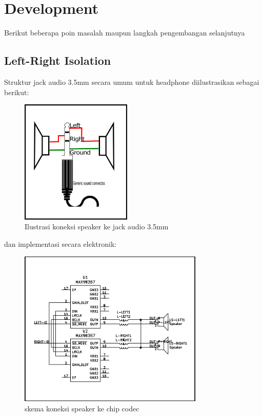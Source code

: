 \documentclass[12pt,]{article}
\begin{document}
	\newpage
	\section{Development}
	
	Berikut beberapa poin masalah maupun langkah pengembangan selanjutnya
	
	\subsection{Left-Right Isolation}
	
	Struktur jack audio 3.5mm secara umum untuk headphone diilustrasikan sebagai berikut:
	
	\begin{figure}[!ht]
		\centering
		\includegraphics[width=150pt]{images/ohmhp}
		\caption{Ilustrasi koneksi speaker ke jack audio 3.5mm}
	\end{figure}

	dan implementasi secara elektronik:
	
	\begin{figure}[!ht]
		\centering
		\includegraphics[width=250pt]{images/skema_lrc}
		\caption{skema koneksi speaker ke chip codec}
	\end{figure}
\end{document}
